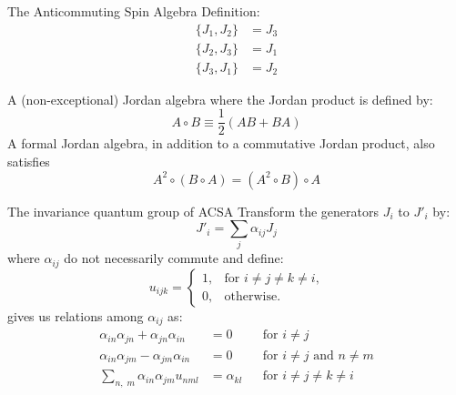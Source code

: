 \documentclass[pdf,colorBG,slideColor,fyma]{prosper}
\newcommand{\anti}[2]{\{#1, #2\}}
\begin{document}

\begin{slide}{The Anticommuting Spin Algebra}
Definition:
\begin{align*}
\anti{J_1}{J_2} & = J_3 \\
\anti{J_2}{J_3} & = J_1 \\
\anti{J_3}{J_1} & = J_2
\end{align*}

A (non-exceptional) Jordan algebra where the Jordan product is
defined by:
\[
A \circ B \equiv \frac12 (AB + BA)
\]
A formal Jordan algebra, in addition to a commutative Jordan
product, also satisfies
\[
A^2\circ(B\circ A) = (A^2\circ B)\circ A
\]
\end{slide}


\begin{slide}{The invariance quantum group of ACSA}
Transform the generators $J_i$ to $J'_i$ by:
\[
J'_i = \sum_j\alpha_{ij} J_j
\]
where $\alpha_{ij}$ do not necessarily commute and define:
\[
u_{ijk} =
  \begin{cases}
    1, & \text{for $i \neq j \neq k \neq i$,} \\
    0, & \text{otherwise.}
  \end{cases}
\]
gives us relations among $\alpha_{ij}$ as:
\begin{align*}
\alpha_{in} \alpha_{jn} + \alpha_{jn} \alpha_{in} & = 0  && \text{for $i \neq j$}\\
\alpha_{in} \alpha_{jm} - \alpha_{jm} \alpha_{in}& = 0 && \text{for $i \neq j$ and $n \neq m$}\\
\sum_{n,\;m} \alpha_{in} \alpha_{jm} u_{nml} & = \alpha_{kl} && \text{for $i \neq j \neq k \neq i$}
\end{align*}

\end{slide}

\end{document}
